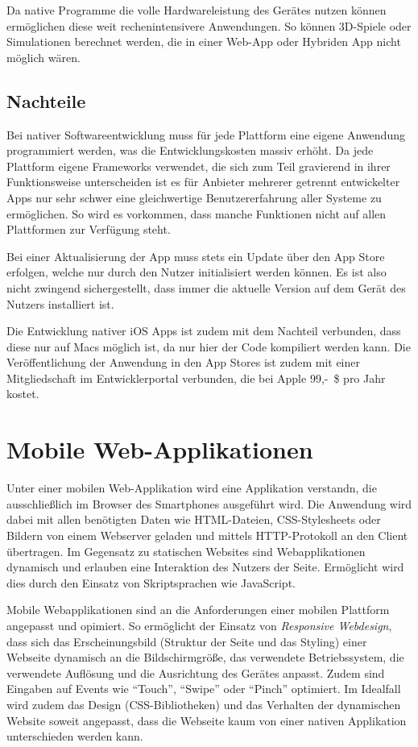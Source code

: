 Da native Programme die volle Hardwareleistung des Gerätes nutzen können ermöglichen diese weit rechenintensivere Anwendungen. So können 3D-Spiele oder Simulationen berechnet werden, die in einer Web-App oder Hybriden App nicht möglich wären.
%
\subsection{Nachteile}
%
Bei nativer Softwareentwicklung muss für jede Plattform eine eigene Anwendung programmiert werden, was die Entwicklungskosten massiv erhöht. Da jede Plattform eigene Frameworks verwendet, die sich zum Teil gravierend in ihrer Funktionsweise unterscheiden ist es für Anbieter mehrerer getrennt entwickelter Apps nur sehr schwer eine gleichwertige Benutzererfahrung aller Systeme zu ermöglichen. So wird es vorkommen, dass manche Funktionen nicht auf allen Plattformen zur Verfügung steht.

Bei einer Aktualisierung der App muss stets ein Update über den App Store erfolgen, welche nur durch den Nutzer initialisiert werden können. Es ist also nicht zwingend sichergestellt, dass immer die aktuelle Version auf dem Gerät des Nutzers installiert ist.

Die Entwicklung nativer iOS Apps ist zudem mit dem Nachteil verbunden, dass diese nur auf Macs möglich ist, da nur hier der Code kompiliert werden kann. Die Veröffentlichung der Anwendung in den App Stores ist zudem mit einer Mitgliedschaft im Entwicklerportal verbunden, die bei Apple 99,-~\$ pro Jahr kostet. 
%
%
\section{Mobile Web-Applikationen}
\label{mobileWebApplikationen}
%
Unter einer mobilen Web-Applikation wird eine Applikation verstandn, die ausschließlich im Browser des Smartphones ausgeführt wird. Die Anwendung wird dabei mit allen benötigten Daten wie HTML-Dateien, CSS-Stylesheets oder Bildern von einem Webserver geladen und mittels HTTP-Protokoll an den Client übertragen. Im Gegensatz zu statischen Websites sind Webapplikationen dynamisch und erlauben eine Interaktion des Nutzers der Seite. Ermöglicht wird dies durch den Einsatz von Skriptsprachen wie JavaScript. 

Mobile Webapplikationen sind an die Anforderungen einer mobilen Plattform angepasst und opimiert. So ermöglicht der Einsatz von \emph{Responsive Webdesign}, dass sich das Erscheinungsbild (Struktur der Seite und das Styling) einer Webseite dynamisch an die Bildschirmgröße, das verwendete Betriebssystem, die verwendete Auflösung und die Ausrichtung des Gerätes anpasst. Zudem sind Eingaben auf Events wie \enquote{Touch}, \enquote{Swipe} oder \enquote{Pinch} optimiert. Im Idealfall wird zudem das Design (CSS-Bibliotheken) und das Verhalten der dynamischen Website soweit angepasst, dass die Webseite kaum von einer nativen Applikation unterschieden werden kann. 

